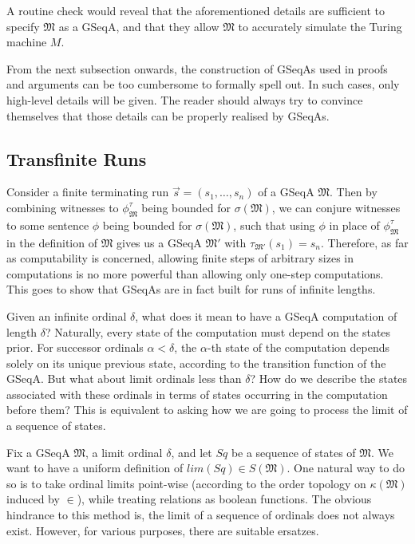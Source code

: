 \documentclass[12pt]{article}
\numberwithin{equation}{section}
\begin{document}
\begin{ex}
A routine check would reveal that the aforementioned details are sufficient to specify $\mathfrak{M}$ as a GSeqA, and that they allow $\mathfrak{M}$ to accurately simulate the Turing machine $M$. 
\end{ex}

From the next subsection onwards, the construction of GSeqAs used in proofs and arguments can be too cumbersome to formally spell out. In such cases, only high-level details will be given. The reader should always try to convince themselves that those details can be properly realised by GSeqAs.

\subsection{Transfinite Runs}\label{ss270}

Consider a finite terminating run $\Vec{s} = (s_1, \dots, s_n)$ of a GSeqA $\mathfrak{M}$. Then by combining witnesses to $\phi^{\tau}_{\mathfrak{M}}$ being bounded for $\sigma(\mathfrak{M})$, we can conjure witnesses to some sentence $\phi$ being bounded for $\sigma(\mathfrak{M})$, such that using $\phi$ in place of $\phi^{\tau}_{\mathfrak{M}}$ in the definition of $\mathfrak{M}$ gives us a GSeqA $\mathfrak{M}'$ with $\tau_{\mathfrak{M}'}(s_1) = s_n$. Therefore, as far as computability is concerned, allowing finite steps of arbitrary sizes in computations is no more powerful than allowing only one-step computations. This goes to show that
GSeqAs are in fact built for runs of infinite lengths.

Given an infinite ordinal $\delta$, what does it mean to have a GSeqA computation of length $\delta$? Naturally, every state of the computation must depend on the states prior. For successor ordinals $\alpha < \delta$, the $\alpha$-th state of the computation depends solely on its unique previous state, according to the transition function of the GSeqA. But what about limit ordinals less than $\delta$? How do we describe the states associated with these ordinals in terms of states occurring in the computation before them? This is equivalent to asking how we are going to process the limit of a sequence of states.

Fix a GSeqA $\mathfrak{M}$, a limit ordinal $\delta$, and let $Sq$ be a sequence of states of $\mathfrak{M}$. We want to have a uniform definition of $lim(Sq) \in S(\mathfrak{M})$. One natural way to do so is to take ordinal limits point-wise (according to the order topology on $\kappa(\mathfrak{M})$ induced by $\in$), while treating relations as boolean functions. The obvious hindrance to this method is, the limit of a sequence of ordinals does not always exist. However, for various purposes, there are suitable ersatzes.
\end{document}
